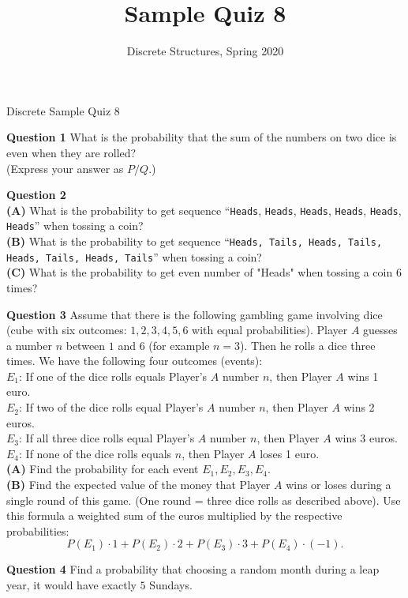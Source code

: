 \documentclass[jou]{apa6}
\title{Sample Quiz 8}
\author{Discrete Structures, Spring 2020}
\affiliation{RBS}
\begin{document}
\thispagestyle{empty}

\twocolumn
{\Large Discrete Sample Quiz 8}

\vspace{10pt}
{\bf Question 1} 
What is the probability that the sum of the numbers on two dice is even when they are rolled?\\
(Express your answer as $P/Q$.)

\vspace{10pt}
{\bf Question 2}\\
{\bf (A)} What is the probability to get sequence ``{\tt Heads}, {\tt Heads}, {\tt Heads}, 
{\tt Heads}, {\tt Heads}, {\tt Heads}'' when 
tossing a coin?\\
{\bf (B)} What is the probability to get sequence ``{\tt Heads, Tails, Heads, Tails, Heads, Tails, Heads, Tails}'' when 
tossing a coin?\\
{\bf (C)} What is the probability to get even number of "Heads" when tossing a coin 6 times?

\vspace{10pt}
{\bf Question 3}
Assume that there is the following gambling game involving dice (cube with six outcomes: $1,2,3,4,5,6$ with 
equal probabilities). Player $A$ guesses a number $n$ between $1$ and $6$ (for example $n = 3$). Then he rolls a dice three times. 
We have the following four outcomes (events):\\
$E_1$: If one of the dice rolls equals Player's $A$ number $n$, then Player $A$ wins 1 euro.\\
$E_2$: If two of the dice rolls equal Player's $A$ number $n$, then Player $A$ wins 2 euros.\\
$E_3$: If all three dice rolls equal Player's $A$ number $n$, then Player $A$ wins 3 euros.\\
$E_4$: If none of the dice rolls equals $n$, then Player $A$ loses 1 euro.\\
{\bf (A)} Find the probability for each event $E_1,E_2,E_3,E_4$.\\
{\bf (B)} Find the expected value of the money that Player $A$ wins or loses during a single round of this game. (One round = three 
dice rolls as described above). Use this formula \textendash{} a weighted sum of the euros multiplied by the respective probabilities:
$$P(E_1)\cdot 1 + P(E_2)\cdot 2 + P(E_3)\cdot 3 + P(E_4)\cdot (-1).$$


\vspace{10pt}
{\bf Question 4} Find a probability that choosing a random month during a leap year, it would have exactly $5$ Sundays.
\end{document}
